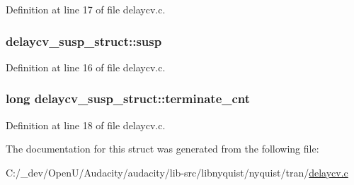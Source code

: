 Definition at line 17 of file delaycv.\+c.

\subsubsection[{\texorpdfstring{susp}{susp}}]{ delaycv\+\_\+susp\+\_\+struct\+::susp}\hypertarget{structdelaycv__susp__struct_ace9ac6e69436620e627aea8d6e0f9d0b}{}\label{structdelaycv__susp__struct_ace9ac6e69436620e627aea8d6e0f9d0b}


Definition at line 16 of file delaycv.\+c.

\subsubsection[{\texorpdfstring{terminate\+\_\+cnt}{terminate_cnt}}]{\setlength{\rightskip}{0pt plus 5cm}long delaycv\+\_\+susp\+\_\+struct\+::terminate\+\_\+cnt}\hypertarget{structdelaycv__susp__struct_a65b4f54e270b399d5ee5e71e1f417936}{}\label{structdelaycv__susp__struct_a65b4f54e270b399d5ee5e71e1f417936}


Definition at line 18 of file delaycv.\+c.



The documentation for this struct was generated from the following file\+:\begin{DoxyCompactItemize}
\item 
C\+:/\+\_\+dev/\+Open\+U/\+Audacity/audacity/lib-\/src/libnyquist/nyquist/tran/\hyperlink{delaycv_8c}{delaycv.\+c}\end{DoxyCompactItemize}
